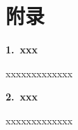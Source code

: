 
\chapter{附\qquad 录}

{%
\noindent\songti\xiaosi\textbf{1.\ xxx} 

\noindent xxxxxxxxxxxxx

\noindent \textbf{2.\ xxx}

\noindent xxxxxxxxxxxxx
}